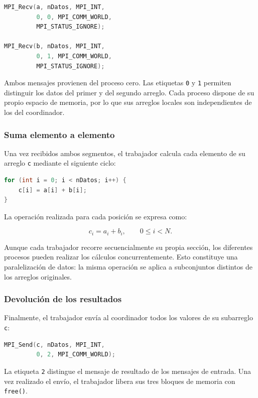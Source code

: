 \documentclass[12pt,a4paper]{article}
\begin{document}
\begin{lstlisting}[language=C]
MPI_Recv(a, nDatos, MPI_INT,
         0, 0, MPI_COMM_WORLD,
         MPI_STATUS_IGNORE);

MPI_Recv(b, nDatos, MPI_INT,
         0, 1, MPI_COMM_WORLD,
         MPI_STATUS_IGNORE);
\end{lstlisting}

Ambos mensajes provienen del proceso cero. Las etiquetas \texttt{0} y
\texttt{1} permiten distinguir los datos del primer y del segundo arreglo.
Cada proceso dispone de su propio espacio de memoria, por lo que sus arreglos
locales son independientes de los del coordinador.

\subsubsection{Suma elemento a elemento}

Una vez recibidos ambos segmentos, el trabajador calcula cada elemento de su
arreglo \texttt{c} mediante el siguiente ciclo:

\begin{lstlisting}[language=C]
for (int i = 0; i < nDatos; i++) {
    c[i] = a[i] + b[i];
}
\end{lstlisting}

La operación realizada para cada posición se expresa como:

\[
c_i=a_i+b_i,\qquad 0\leq i<N.
\]

Aunque cada trabajador recorre secuencialmente su propia sección, los
diferentes procesos pueden realizar los cálculos concurrentemente. Esto
constituye una paralelización de datos: la misma operación se aplica a
subconjuntos distintos de los arreglos originales.

\subsubsection{Devolución de los resultados}

Finalmente, el trabajador envía al coordinador todos los valores de su
subarreglo \texttt{c}:

\begin{lstlisting}[language=C]
MPI_Send(c, nDatos, MPI_INT,
         0, 2, MPI_COMM_WORLD);
\end{lstlisting}

La etiqueta \texttt{2} distingue el mensaje de resultado de los mensajes de
entrada. Una vez realizado el envío, el trabajador libera sus tres bloques de
memoria con \texttt{free()}.
\end{document}
